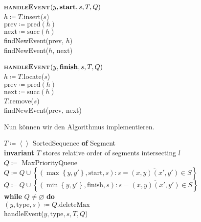\begin{minipage}{.475\textwidth}
  \vspace*{1em}
  \begin{pseudocode}
    \textbf{\textsc{handleEvent}}\( (y, \text{\textbf{start}}, s, T, Q) \) \\
    \( h \coloneqq T \).insert(\( s \)) \\
    \( \text{prev} \coloneqq \text{pred}(h) \) \\
    \( \text{next} \coloneqq \text{succ}(h) \) \\
    findNewEvent(prev, \( h \)) \\
    findNewEvent(\( h \), next)
  \end{pseudocode}
  \vspace*{1em}
\end{minipage}
\hfill
\begin{minipage}{.475\textwidth}
  \vspace*{1em}
  \begin{pseudocode}
    \textbf{\textsc{handleEvent}}\( (y, \text{\textbf{finish}}, s, T, Q) \) \\
    \( h \coloneqq T \).locate(\( s \)) \\
    \( \text{prev} \coloneqq \text{pred}(h) \) \\
    \( \text{next} \coloneqq \text{succ}(h) \) \\
    \( T \).remove(\( s \)) \\
    findNewEvent(prev, next)
  \end{pseudocode}
  \vspace*{1em}
\end{minipage}

Nun können wir den Algorithmus implementieren.

\begin{pseudocode}
  \( T \coloneqq \left\langle  \right\rangle \) SortedSequence \textbf{of} Segment \\
  \textbf{invariant} \( T \) stores relative order of segments intersecting \( l \) \\
  \( Q \coloneqq \) MaxPriorityQueue \\
  \( Q \coloneqq Q \cup \left \{ \left( \max\left \{ y,y' \right \}, \text{start}, s \right) : s = \overline{(x,y)(x',y')} \in S \right \} \) \\
  \( Q \coloneqq Q \cup \left \{ \left( \min\left \{ y,y' \right \}, \text{finish}, s \right) : s = \overline{(x,y)(x',y')} \in S \right \} \) \\
  \textbf{while} \( Q \neq \varnothing \) \textbf{do} \\
  \phantom{\enskip} \( (y,\text{type},s) \coloneqq Q \text{.deleteMax} \) \\
  \phantom{\enskip} handleEvent(\( y,\text{type},s,T,Q \))
\end{pseudocode}

